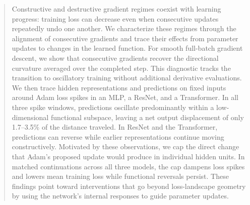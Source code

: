 \begin{abstract}
Constructive and destructive gradient regimes coexist with learning progress: training loss can decrease even when consecutive updates repeatedly undo one another. We characterize these regimes through the alignment of consecutive gradients and trace their effects from parameter updates to changes in the learned function. For smooth full-batch gradient descent, we show that consecutive gradients recover the directional curvature averaged over the completed step. This diagnostic tracks the transition to oscillatory training without additional derivative evaluations. We then trace hidden representations and predictions on fixed inputs around Adam loss spikes in an MLP, a ResNet, and a Transformer. In all three spike windows, predictions oscillate predominantly within a low-dimensional functional subspace, leaving a net output displacement of only 1.7--3.5\% of the distance traveled. In ResNet and the Transformer, predictions can reverse while earlier representations continue moving constructively. Motivated by these observations, we cap the direct change that Adam's proposed update would produce in individual hidden units. In matched continuations across all three models, the cap dampens loss spikes and lowers mean training loss while functional reversals persist. These findings point toward interventions that go beyond loss-landscape geometry by using the network's internal responses to guide parameter updates.
\end{abstract}
